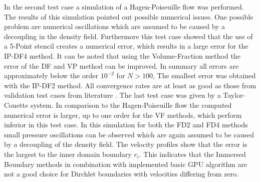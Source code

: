 In the second test case a simulation of a Hagen-Poiseuille flow was performed.
The results of this simulation pointed out possible numerical issues.
One possible problem are numerical oscillations which are assumed to be caused
by a decoupling in the density field.
Furthermore this test case showed that the use of a 5-Point stencil creates a numerical error,
which results in a large error for the IP-DF4 method.
It can be noted that using the Volume-Fraction method  the error of the DF and VP method can be improved.
In summary all errors are approximately below the order  $10^{-2}$ for $N>100$,
The smallest error was obtained with the IP-DF2 method.
All convergence rates are at least as good as those from validation test cases from literature \citep{Gilmanov2003, Gilmanov2005, Fadlun2000}.
The last test case was given by a Taylor-Couette system.
In comparison to the Hagen-Poiseuille flow the computed numerical error is larger,
up to one order for the VF methods, which perform inferior in this test case.
In this simulation for both the FD2 and FD4 methods small pressure oscillations can be observed which are again assumed to be
caused by a decoupling of the density field.
The velocity profiles show that the error is the largest to the inner domain boundary $r_i$.
This indicates that the Immersed Boundary methods in combination with implemented basic GPU algorithm
are not a good choice for Dirchlet boundaries with velocities differing from zero.





